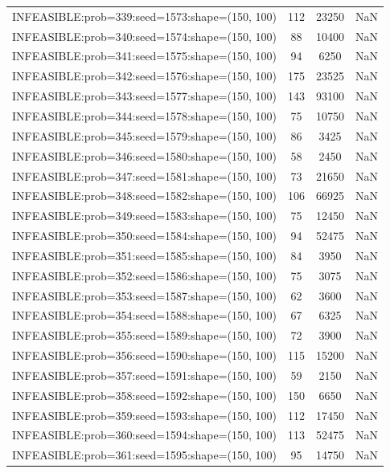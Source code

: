 \begin{longtable}{lccc}
INFEASIBLE:prob=339:seed=1573:shape=(150, 100) &   112 & 23250 &    NaN \\
INFEASIBLE:prob=340:seed=1574:shape=(150, 100) &    88 & 10400 &    NaN \\
INFEASIBLE:prob=341:seed=1575:shape=(150, 100) &    94 &  6250 &    NaN \\
INFEASIBLE:prob=342:seed=1576:shape=(150, 100) &   175 & 23525 &    NaN \\
INFEASIBLE:prob=343:seed=1577:shape=(150, 100) &   143 & 93100 &    NaN \\
INFEASIBLE:prob=344:seed=1578:shape=(150, 100) &    75 & 10750 &    NaN \\
INFEASIBLE:prob=345:seed=1579:shape=(150, 100) &    86 &  3425 &    NaN \\
INFEASIBLE:prob=346:seed=1580:shape=(150, 100) &    58 &  2450 &    NaN \\
INFEASIBLE:prob=347:seed=1581:shape=(150, 100) &    73 & 21650 &    NaN \\
INFEASIBLE:prob=348:seed=1582:shape=(150, 100) &   106 & 66925 &    NaN \\
INFEASIBLE:prob=349:seed=1583:shape=(150, 100) &    75 & 12450 &    NaN \\
INFEASIBLE:prob=350:seed=1584:shape=(150, 100) &    94 & 52475 &    NaN \\
INFEASIBLE:prob=351:seed=1585:shape=(150, 100) &    84 &  3950 &    NaN \\
INFEASIBLE:prob=352:seed=1586:shape=(150, 100) &    75 &  3075 &    NaN \\
INFEASIBLE:prob=353:seed=1587:shape=(150, 100) &    62 &  3600 &    NaN \\
INFEASIBLE:prob=354:seed=1588:shape=(150, 100) &    67 &  6325 &    NaN \\
INFEASIBLE:prob=355:seed=1589:shape=(150, 100) &    72 &  3900 &    NaN \\
INFEASIBLE:prob=356:seed=1590:shape=(150, 100) &   115 & 15200 &    NaN \\
INFEASIBLE:prob=357:seed=1591:shape=(150, 100) &    59 &  2150 &    NaN \\
INFEASIBLE:prob=358:seed=1592:shape=(150, 100) &   150 &  6650 &    NaN \\
INFEASIBLE:prob=359:seed=1593:shape=(150, 100) &   112 & 17450 &    NaN \\
INFEASIBLE:prob=360:seed=1594:shape=(150, 100) &   113 & 52475 &    NaN \\
INFEASIBLE:prob=361:seed=1595:shape=(150, 100) &    95 & 14750 &    NaN \\

\end{longtable}
